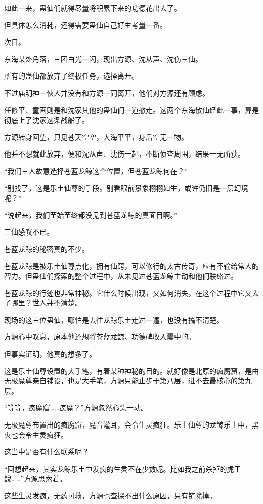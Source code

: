 \begin{this_body}
如此一来，蛊仙们就得尽量将积累下来的功德花出去了。

但具体怎么消耗，还得需要蛊仙自己好生考量一番。

次日。

东海某处角落，三团白光一闪，现出方源、沈从声、沈伤三仙。

所有的蛊仙都放弃了终极任务，选择离开。

不过庙明神一伙人并没有和方源一同离开，他们对方源还有顾虑。

任修平、童画则是和沈家其他的蛊仙们一道撤走。这两个东海散仙经此一事，算是彻底上了沈家这条战船了。

方源转身回望，只见苍天空空，大海平平，身后空无一物。

他并不想就此放弃，便和沈从声、沈伤一起，不断侦查周围，结果一无所获。

“我们三人故意选择苍蓝龙鲸这个位置，但苍蓝龙鲸何在？”

“别找了，这是乐土仙尊的手段。别看眼前景象栩栩如生，或许仍旧是一层幻境呢？”

“说起来，我们至始至终都没见到苍蓝龙鲸的真面目啊。”

三仙感叹不已。

苍蓝龙鲸的秘密真的不少。

苍蓝龙鲸是被乐土仙尊点化，拥有仙窍，可以修行的太古传奇，应有不输给常人的智力。但蛊仙们探索的整个过程中，从未见过苍蓝龙鲸主动和他们联络过。

苍蓝龙鲸的行迹也非常神秘。它什么时候出现，又如何消失，在这个过程中它又去了哪里？世人并不清楚。

现场的这三位蛊仙，哪怕是去往龙鲸乐土走过一遭，也没有搞不清楚。

方源心中叹息，原本他还想将苍蓝龙鲸、功德碑收入囊中的。

但事实证明，他真的想多了。

这是乐土仙尊设置的大手笔，有着某种神秘的目的。就好像是北原的疯魔窟，是由无极魔尊亲自铺设，也是大手笔，方源只能止步于第八层，进不去最核心的第九层。

“等等，疯魔窟……疯魔？”方源忽然心头一动。

无极魔尊布置出的疯魔窟，魔音灌耳，会令生灵疯狂。乐土仙尊的龙鲸乐土中，黑火也会令生灵疯狂。

这当中是否有什么联系呢？

“回想起来，其实龙鲸乐土中发疯的生灵不在少数呢。比如我之前杀掉的虎王鲵……”方源思索着。

这些生灵发疯，无药可救，方源也查探不出什么原因，只有铲除掉。


\end{this_body}
